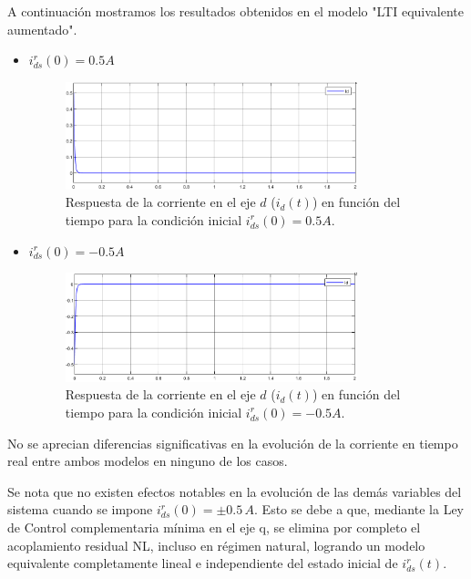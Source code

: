 \documentclass{article}
\begin{document}
A continuación mostramos los resultados obtenidos en el modelo "LTI equivalente aumentado".

\begin{itemize}
    \item $i^r_{ds}(0) = 0.5 A$
    
    \begin{figure}[H]
        \centering
        \includegraphics[width=0.8\textwidth]{5.1.6_cid3.png}
        \caption{Respuesta de la corriente en el eje $d$ ($i_d(t)$) en función del tiempo para la condición inicial $i^r_{ds}(0) = 0.5 A$.}
    \end{figure}

    \item $i^r_{ds}(0) = -0.5 A$
    
    \begin{figure}[H]
        \centering
        \includegraphics[width=0.8\textwidth]{5.1.6_cid4.png}
        \caption{Respuesta de la corriente en el eje $d$ ($i_d(t)$) en función del tiempo para la condición inicial $i^r_{ds}(0) = -0.5 A$.}
    \end{figure}
\end{itemize}

No se aprecian diferencias significativas en la evolución de la corriente en tiempo real entre ambos 
modelos en ninguno de los casos.

Se nota que no existen efectos notables en la evolución de las demás variables del sistema cuando se 
impone $i^r_{ds}(0) = ±0.5 \, A$. Esto se debe a que, mediante la Ley de Control complementaria mínima en el 
eje q, se elimina por completo el acoplamiento residual NL, incluso en régimen natural, logrando un 
modelo equivalente completamente lineal e independiente del estado inicial de $i^r_{ds}(t)$.
\end{document}
